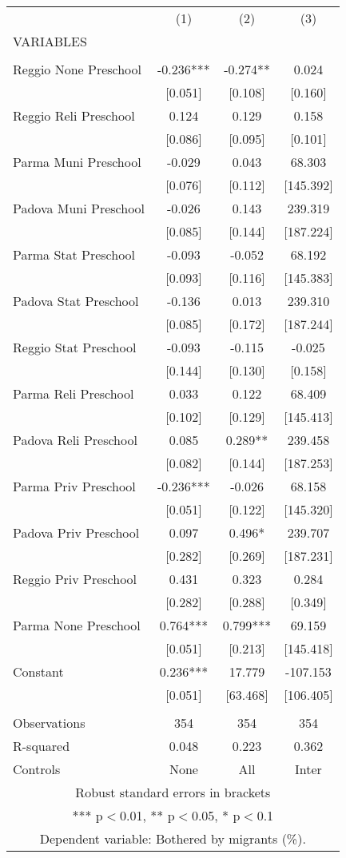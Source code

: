 \begin{tabular}{lccc} \hline
 & (1) & (2) & (3) \\
VARIABLES &  &  &  \\ \hline
 &  &  &  \\
Reggio None Preschool & -0.236*** & -0.274** & 0.024 \\
 & [0.051] & [0.108] & [0.160] \\
Reggio Reli Preschool & 0.124 & 0.129 & 0.158 \\
 & [0.086] & [0.095] & [0.101] \\
Parma Muni Preschool & -0.029 & 0.043 & 68.303 \\
 & [0.076] & [0.112] & [145.392] \\
Padova Muni Preschool & -0.026 & 0.143 & 239.319 \\
 & [0.085] & [0.144] & [187.224] \\
Parma Stat Preschool & -0.093 & -0.052 & 68.192 \\
 & [0.093] & [0.116] & [145.383] \\
Padova Stat Preschool & -0.136 & 0.013 & 239.310 \\
 & [0.085] & [0.172] & [187.244] \\
Reggio Stat Preschool & -0.093 & -0.115 & -0.025 \\
 & [0.144] & [0.130] & [0.158] \\
Parma Reli Preschool & 0.033 & 0.122 & 68.409 \\
 & [0.102] & [0.129] & [145.413] \\
Padova Reli Preschool & 0.085 & 0.289** & 239.458 \\
 & [0.082] & [0.144] & [187.253] \\
Parma Priv Preschool & -0.236*** & -0.026 & 68.158 \\
 & [0.051] & [0.122] & [145.320] \\
Padova Priv Preschool & 0.097 & 0.496* & 239.707 \\
 & [0.282] & [0.269] & [187.231] \\
Reggio Priv Preschool & 0.431 & 0.323 & 0.284 \\
 & [0.282] & [0.288] & [0.349] \\
Parma None Preschool & 0.764*** & 0.799*** & 69.159 \\
 & [0.051] & [0.213] & [145.418] \\
Constant & 0.236*** & 17.779 & -107.153 \\
 & [0.051] & [63.468] & [106.405] \\
 &  &  &  \\
Observations & 354 & 354 & 354 \\
R-squared & 0.048 & 0.223 & 0.362 \\
 Controls & None & All & Inter \\ \hline
\multicolumn{4}{c}{ Robust standard errors in brackets} \\
\multicolumn{4}{c}{ *** p$<$0.01, ** p$<$0.05, * p$<$0.1} \\
\multicolumn{4}{c}{ Dependent variable: Bothered by migrants (\%).} \\
\end{tabular}
